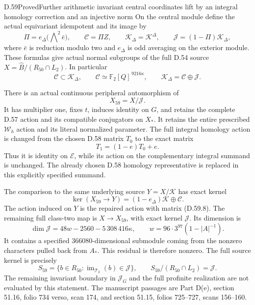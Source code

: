 \begin{statement}{D.59}{Proved}{Further arithmetic invariant central coordinates lift by an integral homology correction and an injective norm}
On the central module define the actual equivariant
idempotent and its image by
\[
 \Pi=e_\Delta\bigl(\bigwedge\nolimits^2\bar e\bigr),
 \qquad \mathcal C=\Pi Z,\qquad
 \mathcal K_\Delta=\mathcal K^\Delta,\qquad
 \mathcal J=(1-\Pi)\mathcal K_\Delta,
 \tag{D.59.5}
\]
where \(\bar e\) is reduction modulo two and
\(e_\Delta\) is odd averaging on the exterior
module. These formulas give actual normal
subgroups of the full D.54 source
\(X=\widehat B/(R_{50}\cap L_2)\). In particular
\[
 \mathcal C\subset\mathcal K_\Delta,
 \qquad
 \mathcal C\simeq
       \mathbb F_2[Q]^{\,9216\kappa},\qquad
 \mathcal K_\Delta=\mathcal C\oplus\mathcal J.
 \tag{D.59.6}
\]

There is an actual continuous peripheral automorphism
of
\[
                         X_{59}=X/\mathcal J.
 \tag{D.59.7}
\]
It has multiplier one, fixes \(t\), induces identity
on \(G\), and retains the complete D.57 action
and its compatible conjugators on \(X_*\).
It retains the entire prescribed \(\mathcal W_h\)
action and its literal normalized parameter.
The full integral homology action is changed from
the chosen D.58 matrix \(T_0\) to the exact matrix
\[
                       T_1=(1-e)T_0+e.
 \tag{D.59.8}
\]
Thus it is identity on \(\mathscr E\), while its
action on the complementary integral summand is
unchanged. The already chosen D.58 homology
representative is replaced in this explicitly
specified summand.

The comparison to the same underlying source
\(Y=X/\mathcal K\) has exact kernel
\[
 \ker(X_{59}\to Y)
       =(1-e_\Delta)\mathcal K\oplus\mathcal C.
 \tag{D.59.9}
\]
The action induced on \(Y\) is the repaired action
with matrix (D.59.8). The remaining full class-two
map is \(X\to X_{59}\), with exact kernel
\(\mathcal J\). Its dimension is
\[
 \dim\mathcal J=48w-2560-5\,308\,416\kappa,
 \qquad w=96\cdot3^{97}(1-|A|^{-1}).
 \tag{D.59.10}
\]
It contains a specified 366080-dimensional submodule
coming from the nonzero characters pulled back
from \(A_*\). This residual is therefore nonzero.
The full source kernel is precisely
\[
 S_{59}=\{b\in R_{50}:
               \operatorname{im}_{\mathcal T_2}(b)\in\mathcal J\},
 \qquad S_{59}/(R_{50}\cap L_2)=\mathcal J.
 \tag{D.59.11}
\]
The remaining invariant boundary in
\(\mathcal J_G\) and the full profinite realization
are not evaluated by this statement.
The manuscript passages are Part D(e), section
51.16, folio 734 verso, scan 174, and section
51.15, folios 725--727, scans 156--160.
\end{statement}
